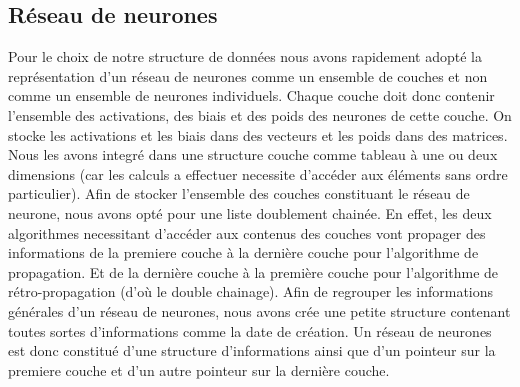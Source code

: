\documentclass{article}
\begin{document}
	\subsection{Réseau de neurones}
	Pour le choix de notre structure de données nous avons rapidement adopté la représentation d'un réseau de neurones comme un ensemble de couches et non comme un ensemble de neurones individuels. 
	Chaque couche doit donc contenir l'ensemble des activations, des biais et des poids des neurones de cette couche.
	On stocke les activations et les biais dans des vecteurs et les poids dans des matrices.
	Nous les avons integré dans une structure couche comme tableau à une ou deux dimensions (car les calculs a effectuer necessite d'accéder aux éléments sans ordre particulier).	
	Afin de stocker l'ensemble des couches constituant le réseau de neurone, nous avons opté pour une liste doublement chainée. 
	En effet, les deux algorithmes necessitant d'accéder aux contenus des couches vont propager des informations de la premiere couche à la dernière couche pour l'algorithme de propagation. 
	Et de la dernière couche à la première couche pour l'algorithme de rétro-propagation (d'où le double chainage).	
	Afin de regrouper les informations générales d'un réseau de neurones, nous avons crée une petite structure contenant toutes sortes d'informations comme la date de création.	
	Un réseau de neurones est donc constitué d'une structure d'informations ainsi que d'un pointeur sur la premiere couche et d'un autre pointeur sur la dernière couche.
\end{document}
